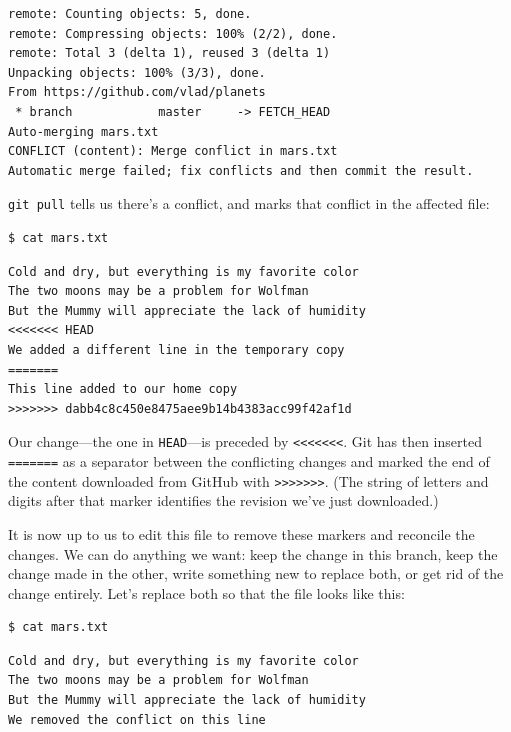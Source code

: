 \documentclass[]{book}
\begin{document}
\begin{verbatim}
remote: Counting objects: 5, done.
remote: Compressing objects: 100% (2/2), done.
remote: Total 3 (delta 1), reused 3 (delta 1)
Unpacking objects: 100% (3/3), done.
From https://github.com/vlad/planets
 * branch            master     -> FETCH_HEAD
Auto-merging mars.txt
CONFLICT (content): Merge conflict in mars.txt
Automatic merge failed; fix conflicts and then commit the result.
\end{verbatim}

\texttt{git pull} tells us there's a conflict, and marks that conflict
in the affected file:

\begin{verbatim}
$ cat mars.txt
\end{verbatim}

\begin{verbatim}
Cold and dry, but everything is my favorite color
The two moons may be a problem for Wolfman
But the Mummy will appreciate the lack of humidity
<<<<<<< HEAD
We added a different line in the temporary copy
=======
This line added to our home copy
>>>>>>> dabb4c8c450e8475aee9b14b4383acc99f42af1d
\end{verbatim}

Our change---the one in \texttt{HEAD}---is preceded by
\texttt{\textless{}\textless{}\textless{}\textless{}\textless{}\textless{}\textless{}}.
Git has then inserted \texttt{=======} as a separator between the
conflicting changes and marked the end of the content downloaded from
GitHub with
\texttt{\textgreater{}\textgreater{}\textgreater{}\textgreater{}\textgreater{}\textgreater{}\textgreater{}}.
(The string of letters and digits after that marker identifies the
revision we've just downloaded.)

It is now up to us to edit this file to remove these markers and
reconcile the changes. We can do anything we want: keep the change in
this branch, keep the change made in the other, write something new to
replace both, or get rid of the change entirely. Let's replace both so
that the file looks like this:

\begin{verbatim}
$ cat mars.txt
\end{verbatim}

\begin{verbatim}
Cold and dry, but everything is my favorite color
The two moons may be a problem for Wolfman
But the Mummy will appreciate the lack of humidity
We removed the conflict on this line
\end{verbatim}
\end{document}
